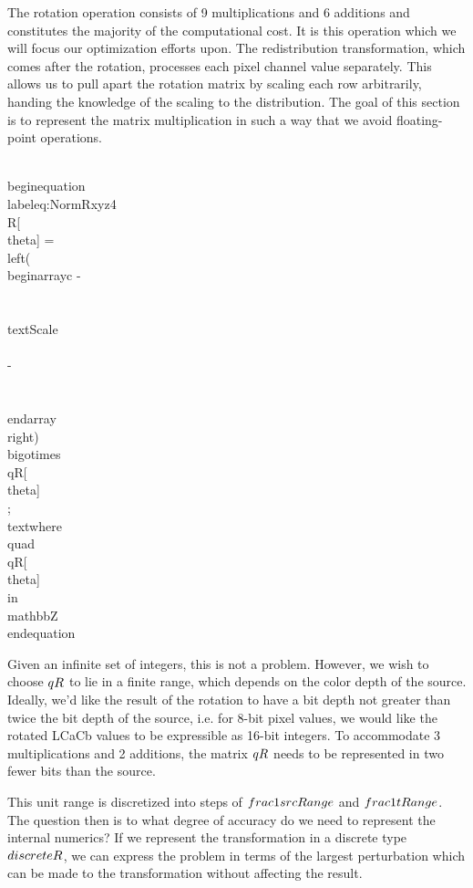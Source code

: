 The rotation operation consists of 9 multiplications and 6 additions and constitutes the majority of the computational cost. It is this operation which we will focus our optimization efforts upon. The redistribution transformation, which comes after the rotation, processes each pixel channel value separately. This allows us to pull apart the rotation matrix by scaling each row arbitrarily, handing the knowledge of the scaling to the distribution. The goal of this section is to represent the matrix multiplication in such a way that we avoid floating-point operations.

\\begin{equation}\\label{eq:NormRxyz4}
 \\R[\\theta] =
\\left(
\\begin{array}{c}
 -  \\\\
 \\text{Scale} \\\\
 -  \\\\
\\end{array}
\\right)
\\bigotimes
\\qR[\\theta]\\;\\text{where}\\quad{\\qR[\\theta]\\in\\mathbb{Z}}
\\end{equation}

Given an infinite set of integers, this is not a problem. However, we wish to choose $\\qR$ to lie in a finite range, which depends on the color depth of the source. Ideally, we'd like the result of the rotation to have a bit depth not greater than twice the bit depth of the source, i.e. for 8-bit pixel values, we would like the rotated LCaCb values to be expressible as 16-bit integers. To accommodate 3 multiplications and 2 additions, the matrix $\\qR$ needs to be represented in two fewer bits than the source.

This unit range is discretized into steps of $\\frac{1}{\\srcRange}$ and $\\frac{1}{\\tRange}$. The question then is to what degree of accuracy do we need to represent the internal numerics? If we represent the transformation in a discrete type $\\discreteR$, we can express the problem in terms of the largest perturbation which can be made to the transformation without affecting the result.


